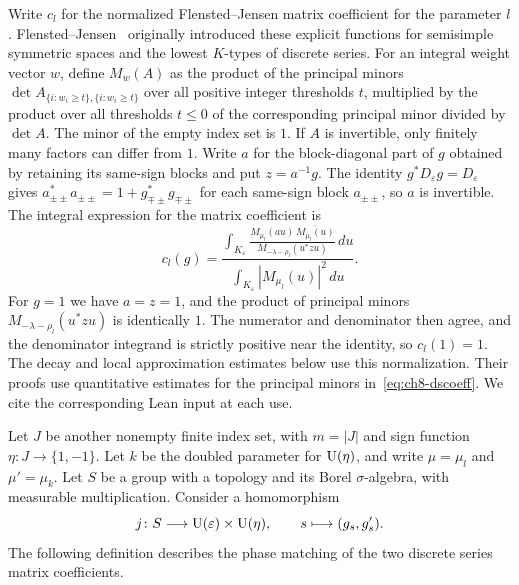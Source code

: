 Write $c_l$ for the normalized Flensted--Jensen matrix coefficient for the parameter $l$. Flensted--Jensen~\cite{FlenstedJensen1980} originally introduced these explicit functions for semisimple symmetric spaces and the lowest $K$-types of discrete series. For an integral weight vector $w$, define $M_w(A)$ as the product of the principal minors $\det A_{\{i:w_i\ge t\},\{i:w_i\ge t\}}$ over all positive integer thresholds $t$, multiplied by the product over all thresholds $t\le0$ of the corresponding principal minor divided by $\det A$. The minor of the empty index set is $1$. If $A$ is invertible, only finitely many factors can differ from $1$. Write $a$ for the block-diagonal part of $g$ obtained by retaining its same-sign blocks and put $z=a^{-1}g$. The identity $g^*D_\varepsilon g=D_\varepsilon$ gives $a_{\pm\pm}^*a_{\pm\pm}=1+g_{\mp\pm}^*g_{\mp\pm}$ for each same-sign block $a_{\pm\pm}$, so $a$ is invertible. The integral expression for the matrix coefficient is
\begin{equation}
\label{eq:ch8-dscoeff}
c_l(g)=
\frac{
 \displaystyle\int_{K_\varepsilon}
 \frac{M_{\mu_l}(au)\,\overline{M_{\mu_l}(u)}}
 {M_{-\lambda-\rho_l}(u^*zu)}\,du
}{
 \displaystyle\int_{K_\varepsilon}|M_{\mu_l}(u)|^2\,du
}.
\end{equation}
For $g=1$ we have $a=z=1$, and the product of principal minors $M_{-\lambda-\rho_l}(u^*zu)$ is identically $1$. The numerator and denominator then agree, and the denominator integrand is strictly positive near the identity, so $c_l(1)=1$. The decay and local approximation estimates below use this normalization. Their proofs use quantitative estimates for the principal minors in~\eqref{eq:ch8-dscoeff}. We cite the corresponding Lean input at each use.

Let $J$ be another nonempty finite index set, with $m=|J|$ and sign function $\eta\colon J\to\{1,-1\}$. Let $k$ be the doubled parameter for $\operatorname{U}(\eta)$, and write $\mu=\mu_l$ and $\mu'=\mu_k$. Let $S$ be a group with a topology and its Borel $\sigma$-algebra, with measurable multiplication. Consider a homomorphism
\[
j\colon S\longrightarrow \operatorname{U}(\varepsilon)\times \operatorname{U}(\eta),\qquad
s\longmapsto (g_s,g'_s).
\]
The following definition describes the phase matching of the two discrete series matrix coefficients.

